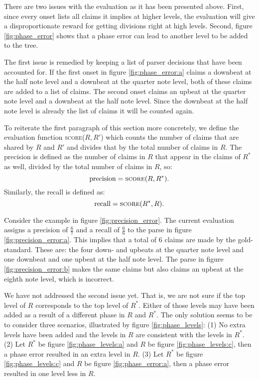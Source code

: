 There are two issues with the evaluation as it has been presented above. First, since every onset lists all claims it implies at higher levels, the evaluation will give a disproportionate reward for getting divisions right at high levels. Second, figure \ref{fig:phase_error} shows that a phase error can lead to another level to be added to the tree. 

The first issue is remedied by keeping a list of parser decisions that have been accounted for. If the first onset in figure \ref{fig:phase_error:a} claims a downbeat at the half note level and a downbeat at the quarter note level, both of these claims are added to a list of claims. The second onset claims an upbeat at the quarter note level and a downbeat at the half note level. Since the downbeat at the half note level is already the list of claims it will be counted again.

To reiterate the first paragraph of this section more concretely, we define the evaluation function \textsc{score}($R, R'$) which counts the number of claims that are shared by $R$ and $R'$ and divides that by the total number of claims in $R$. The precision is defined as the number of claims in $R$ that appear in the claims of $R^*$ as well, divided by the total number of claims in $R$, so:
\begin{equation}
\label{eq:precision}
\mathrm{precision} = \textsc{score}(R, R^*).
\end{equation}
Similarly, the recall is defined as:
\begin{equation}
\label{eq:recall}
\mathrm{recall} = \textsc{score}(R^*, R).
\end{equation}

Consider the example in figure \ref{fig:precision_error}. The current evaluation assigns a precision of $\frac{6}{7}$ and a recall of $\frac{6}{6}$ to the parse in figure \ref{fig:precision_error:a}. This implies that a total of $6$ claims are made by the gold-standard. These are: the four down- and upbeats at the quarter note level and one downbeat and one upbeat at the half note level. The parse in figure \ref{fig:precision_error:b} makes the same claims but also claims an upbeat at the eighth note level, which is incorrect.

We have not addressed the second issue yet. That is, we are not sure if the top level of $R$ corresponds to the top level of $R^*$. Either of those levels may have been added as a result of a different phase in $R$ and $R^*$. The only solution seems to be to consider three scenarios, illustrated by figure \ref{fig:phase_levels}: (1) No extra levels have been added and the levels in $R$ are consistent with the levels in $R^*$. (2) Let $R^*$ be figure \ref{fig:phase_levels:a} and $R$ be figure \ref{fig:phase_levels:c}, then a phase error resulted in an extra level in $R$. (3) Let $R^*$ be figure \ref{fig:phase_levels:c} and $R$ be figure \ref{fig:phase_error:a}, then a phase error resulted in one level less in $R$. 


